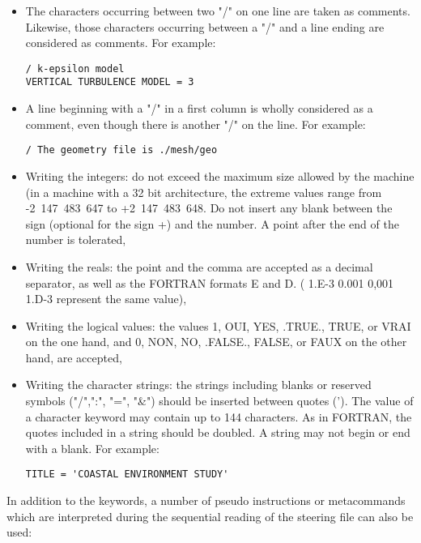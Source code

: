 \begin{itemize}
\item The characters occurring between two "/" on one line are taken as
comments. Likewise, those characters occurring between a "/" and a line ending
are considered as comments. For example:

\begin{lstlisting}[language=TelemacCas]
/ k-epsilon model
VERTICAL TURBULENCE MODEL = 3
\end{lstlisting}

\item A line beginning with a "/" in a first column is wholly considered as a
comment, even though there is another "/" on the line. For example:

\begin{lstlisting}[language=TelemacCas]
/ The geometry file is ./mesh/geo
\end{lstlisting}

\item Writing the integers: do not exceed the maximum size allowed by the
machine (in a machine with a 32 bit architecture, the extreme values range from
-2~147~483~647 to +2~147~483~648. Do not insert any blank between the sign
(optional for the sign +) and the number. A point after the end of the number
is tolerated,

\item Writing the reals: the point and the comma are accepted as a decimal
separator, as well as the FORTRAN formats E and D. ( 1.E-3  0.001  0,001  1.D-3
represent the same value),

\item Writing the logical values: the values 1, OUI,  YES,  .TRUE.,  TRUE,  or
VRAI on the one hand, and 0, NON,  NO,  .FALSE.,  FALSE, or FAUX on the other
hand, are accepted,

\item Writing the character strings: the strings including blanks or reserved
symbols ("/",":", "=", "\&") should be inserted between quotes ('). The value
of a character keyword may contain up to 144 characters. As in FORTRAN, the
quotes included in a string should be doubled. A string may not begin or end
with a blank. For example:

\begin{lstlisting}[language=TelemacCas]
TITLE = 'COASTAL ENVIRONMENT STUDY'
\end{lstlisting}

\end{itemize}

In addition to the keywords, a number of pseudo instructions or metacommands
which are interpreted during the sequential reading of the steering file can
also be used:

